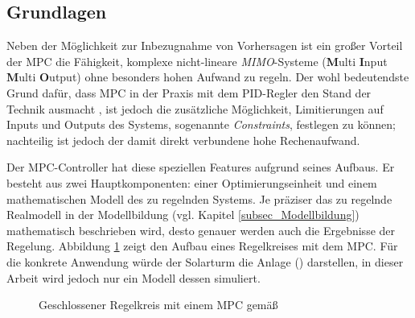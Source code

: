 \subsection{Grundlagen} \label{subsec_GrundlagenMPC}
Neben der Möglichkeit zur Inbezugnahme von Vorhersagen ist ein großer Vorteil der MPC die Fähigkeit, komplexe nicht-lineare \textit{MIMO}-Systeme (\textbf{M}ulti \textbf{I}nput \textbf{M}ulti \textbf{O}utput) ohne besonders hohen Aufwand zu regeln.
Der wohl bedeutendste Grund dafür, dass MPC in der Praxis mit dem PID-Regler den Stand der Technik ausmacht \cite[S.viii]{Kouvaritakis}, ist jedoch die zusätzliche Möglichkeit, Limitierungen auf Inputs und Outputs des Systems, sogenannte \textit{Constraints}, festlegen zu können; nachteilig ist jedoch der damit direkt verbundene hohe Rechenaufwand. \cite[S.1-2]{Kouvaritakis}

Der MPC-Controller hat diese speziellen Features aufgrund seines Aufbaus.
Er besteht aus zwei Hauptkomponenten: einer Optimierungseinheit und einem mathematischen Modell des zu regelnden Systems.
Je präziser das zu regelnde Realmodell in der Modellbildung (vgl. Kapitel \ref{subsec_Modellbildung}) mathematisch beschrieben wird, desto genauer werden auch die Ergebnisse der Regelung.
Abbildung \ref{fig_RegelkreisMPC} zeigt den Aufbau eines Regelkreises mit dem MPC.
Für die konkrete Anwendung würde der Solarturm die Anlage () darstellen, in dieser Arbeit wird jedoch nur ein Modell dessen simuliert.

\begin{figure}[h!]
    \centering
    \setlength{\fboxsep}{1pt}
    \setlength{\fboxrule}{1pt}
\caption[Geschlossener Regelkreis mit einem MPC]{Geschlossener Regelkreis mit einem MPC gemäß\cite[S.2]{Schwenzer}}
    \label{fig_RegelkreisMPC}
\end{figure}

